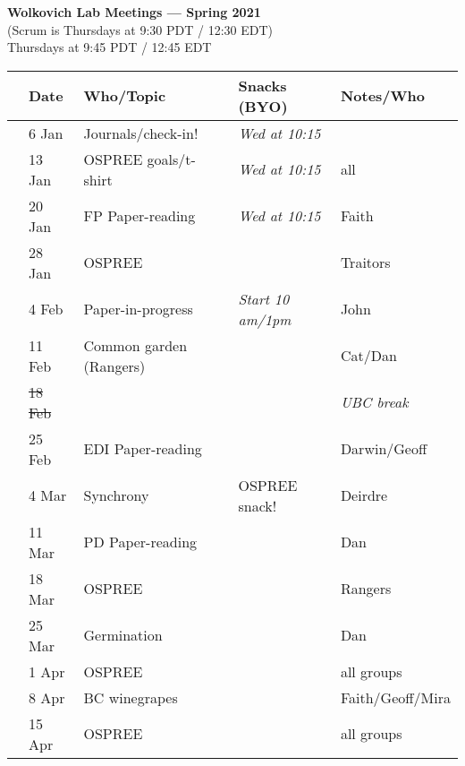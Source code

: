 \documentclass[11pt]{article}
\begin{document}
 
\raggedright
{}

\begin{center} 
{\large \textbf{Wolkovich Lab Meetings --- Spring 2021}} \\ [2pt]
(Scrum is Thursdays at 9:30 PDT / 12:30 EDT)\\
Thursdays at 9:45 PDT / 12:45 EDT \\
\end{center} 

\begin{center}
\begin{tabular}{ p{0.2 cm}  p{2 cm}  p{4.5 cm}  p{3 cm}  p{3.5 cm} }  \hline \hline
 & \textbf{Date}
   & \textbf{Who/Topic}
      & \textbf{Snacks (BYO)} 
         & \textbf{Notes/Who} \\ 
\hline \hline
 & 6 Jan & Journals/check-in! &       \emph{Wed at 10:15} & \\\hline
 & 13 Jan & OSPREE goals/t-shirt & \emph{Wed at 10:15}  & all \\\hline
 & 20 Jan & FP Paper-reading &     \emph{Wed at 10:15}  & Faith \\\hline  %
 & 28 Jan & OSPREE  &       &  Traitors \\\hline
 & 4 Feb & Paper-in-progress  &  \emph{Start 10 am/1pm}     & John \\\hline
 & 11 Feb & Common garden (Rangers) &       & Cat/Dan  \\\hline
 & \sout{18 Feb} &  &       &  \emph{UBC break} \\\hline
 & 25 Feb & EDI Paper-reading &       & Darwin/Geoff\\\hline
 & 4 Mar &  Synchrony &  OSPREE snack!     &  Deirdre \\\hline
 & 11 Mar &  PD Paper-reading &    & Dan\\\hline %
 & 18 Mar & OSPREE &       & Rangers \\\hline
 & 25 Mar & Germination &   &  Dan\\\hline
 & 1 Apr & OSPREE  &       &  all groups \\\hline
 & 8 Apr & BC winegrapes  &       & Faith/Geoff/Mira \\\hline
 & 15 Apr & OSPREE &    & all groups\\\hline %

\hline
\end{tabular}
\end{center}
\end{document}
